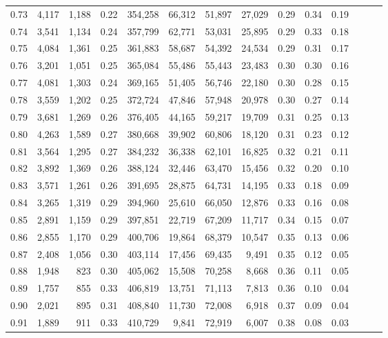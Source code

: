 \begin{tabular}{rrrrrrrrrrrrrr}
0.73 &  4,117 &  1,188 &  0.22 &  354,258 &   66,312 &  51,897 &  27,029 &  0.29 &  0.34 &      0.19 \\
0.74 &  3,541 &  1,134 &  0.24 &  357,799 &   62,771 &  53,031 &  25,895 &  0.29 &  0.33 &      0.18 \\
0.75 &  4,084 &  1,361 &  0.25 &  361,883 &   58,687 &  54,392 &  24,534 &  0.29 &  0.31 &      0.17 \\
0.76 &  3,201 &  1,051 &  0.25 &  365,084 &   55,486 &  55,443 &  23,483 &  0.30 &  0.30 &      0.16 \\
0.77 &  4,081 &  1,303 &  0.24 &  369,165 &   51,405 &  56,746 &  22,180 &  0.30 &  0.28 &      0.15 \\
0.78 &  3,559 &  1,202 &  0.25 &  372,724 &   47,846 &  57,948 &  20,978 &  0.30 &  0.27 &      0.14 \\
0.79 &  3,681 &  1,269 &  0.26 &  376,405 &   44,165 &  59,217 &  19,709 &  0.31 &  0.25 &      0.13 \\
0.80 &  4,263 &  1,589 &  0.27 &  380,668 &   39,902 &  60,806 &  18,120 &  0.31 &  0.23 &      0.12 \\
0.81 &  3,564 &  1,295 &  0.27 &  384,232 &   36,338 &  62,101 &  16,825 &  0.32 &  0.21 &      0.11 \\
0.82 &  3,892 &  1,369 &  0.26 &  388,124 &   32,446 &  63,470 &  15,456 &  0.32 &  0.20 &      0.10 \\
0.83 &  3,571 &  1,261 &  0.26 &  391,695 &   28,875 &  64,731 &  14,195 &  0.33 &  0.18 &      0.09 \\
0.84 &  3,265 &  1,319 &  0.29 &  394,960 &   25,610 &  66,050 &  12,876 &  0.33 &  0.16 &      0.08 \\
0.85 &  2,891 &  1,159 &  0.29 &  397,851 &   22,719 &  67,209 &  11,717 &  0.34 &  0.15 &      0.07 \\
0.86 &  2,855 &  1,170 &  0.29 &  400,706 &   19,864 &  68,379 &  10,547 &  0.35 &  0.13 &      0.06 \\
0.87 &  2,408 &  1,056 &  0.30 &  403,114 &   17,456 &  69,435 &   9,491 &  0.35 &  0.12 &      0.05 \\
0.88 &  1,948 &    823 &  0.30 &  405,062 &   15,508 &  70,258 &   8,668 &  0.36 &  0.11 &      0.05 \\
0.89 &  1,757 &    855 &  0.33 &  406,819 &   13,751 &  71,113 &   7,813 &  0.36 &  0.10 &      0.04 \\
0.90 &  2,021 &    895 &  0.31 &  408,840 &   11,730 &  72,008 &   6,918 &  0.37 &  0.09 &      0.04 \\
0.91 &  1,889 &    911 &  0.33 &  410,729 &    9,841 &  72,919 &   6,007 &  0.38 &  0.08 &      0.03 \\

\end{tabular}
